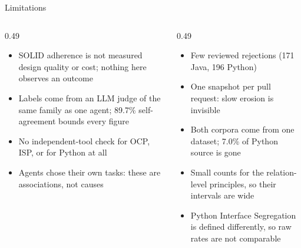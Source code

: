 \documentclass[11pt,aspectratio=169]{beamer}
\begin{document}
\begin{frame}{Limitations}
\begin{columns}[T,onlytextwidth]
\begin{column}{0.49\textwidth}
\begin{itemize}\setlength{\itemsep}{3pt}\small
  \item SOLID adherence is not measured design quality or cost; nothing here observes an outcome
  \item Labels come from an LLM judge of the same family as one agent; 89.7\% self-agreement bounds
        every figure
  \item No independent-tool check for OCP, ISP, or for Python at all
  \item Agents chose their own tasks: these are associations, not causes
\end{itemize}
\end{column}
\begin{column}{0.49\textwidth}
\begin{itemize}\setlength{\itemsep}{3pt}\small
  \item Few reviewed rejections (171 Java, 196 Python)
  \item One snapshot per pull request: slow erosion is invisible
  \item Both corpora come from one dataset; 7.0\% of Python source is gone
  \item Small counts for the relation-level principles, so their intervals are wide
  \item Python Interface Segregation is defined differently, so raw rates are not comparable
\end{itemize}
\end{column}
\end{columns}
\end{frame}
\end{document}
